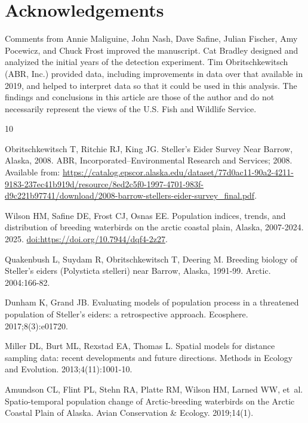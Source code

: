 \documentclass[
  10pt,
  letterpaper,
]{article}
\begin{document}
\section{Acknowledgements}\label{acknowledgements}

Comments from Annie Maliguine, John Nash, Dave Safine, Julian Fischer,
Amy Pocewicz, and Chuck Frost improved the manuscript. Cat Bradley
designed and analyized the initial years of the detection experiment.
Tim Obritschkewitsch (ABR, Inc.) provided data, including improvements
in data over that available in 2019, and helped to interpret data so
that it could be used in this analysis. The findings and conclusions in
this article are those of the author and do not necessarily represent
the views of the U.S. Fish and Wildlife Service.

\begin{thebibliography}{10}

Obritschkewitsch T, Ritchie RJ, King JG.
\newblock Steller's Eider Survey Near Barrow, Alaska, 2008.
\newblock ABR, Incorporated--Environmental Research and Services; 2008.
\newblock Available from: \url{https://catalog.epscor.alaska.edu/dataset/77d0ac11-90a2-4211-9183-237ec41b919d/resource/8ed2c5f0-1997-4701-983f-d9c221b97741/download/2008-barrow-stellers-eider-survey_final.pdf}.

Wilson HM, Safine DE, Frost CJ, Osnas EE.
\newblock Population indices, trends, and distribution of breeding waterbirds on the arctic coastal plain, Alaska, 2007-2024. 2025.
\newblock \href {http://dx.doi.org/https://doi.org/10.7944/dqf4-2z27} {doi:https://doi.org/10.7944/dqf4-2z27}.

Quakenbush L, Suydam R, Obritschkewitsch T, Deering M.
\newblock Breeding biology of Steller's eiders (Polysticta stelleri) near Barrow, Alaska, 1991-99.
\newblock Arctic. 2004:166-82.

Dunham K, Grand JB.
\newblock Evaluating models of population process in a threatened population of Steller's eiders: a retrospective approach.
\newblock Ecosphere. 2017;8(3):e01720.

Miller DL, Burt ML, Rexstad EA, Thomas L.
\newblock Spatial models for distance sampling data: recent developments and future directions.
\newblock Methods in Ecology and Evolution. 2013;4(11):1001-10.

Amundson CL, Flint PL, Stehn RA, Platte RM, Wilson HM, Larned WW, et~al.
\newblock Spatio-temporal population change of Arctic-breeding waterbirds on the Arctic Coastal Plain of Alaska.
\newblock Avian Conservation \& Ecology. 2019;14(1).


\end{thebibliography}
\end{document}
